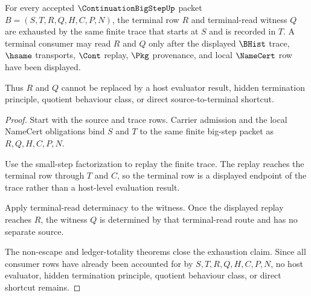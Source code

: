 \begin{theorem}
\label{thm:continuation-bigstep-terminal-source-exhaustion}
For every accepted $\ContinuationBigStepUp$ packet $B=(S,T,R,Q,H,C,P,N)$, the terminal row $R$ and terminal-read witness $Q$ are exhausted by the same finite trace that starts at $S$ and is recorded in $T$. A terminal consumer may read $R$ and $Q$ only after the displayed $\BHist$ trace, $\hsame$ transports, $\Cont$ replay, $\Pkg$ provenance, and local $\NameCert$ row have been displayed.

Thus $R$ and $Q$ cannot be replaced by a host evaluator result, hidden termination principle, quotient behaviour class, or direct source-to-terminal shortcut.
\end{theorem}
\begin{proof}
Start with the source and trace rows. Carrier admission and the local NameCert obligations bind $S$ and $T$ to the same finite big-step packet as $R,Q,H,C,P,N$.

Use the small-step factorization to replay the finite trace. The replay reaches the terminal row through $T$ and $C$, so the terminal row is a displayed endpoint of the trace rather than a host-level evaluation result.

Apply terminal-read determinacy to the witness. Once the displayed replay reaches $R$, the witness $Q$ is determined by that terminal-read route and has no separate source.

The non-escape and ledger-totality theorems close the exhaustion claim. Since all consumer rows have already been accounted for by $S,T,R,Q,H,C,P,N$, no host evaluator, hidden termination principle, quotient behaviour class, or direct shortcut remains.
\end{proof}

